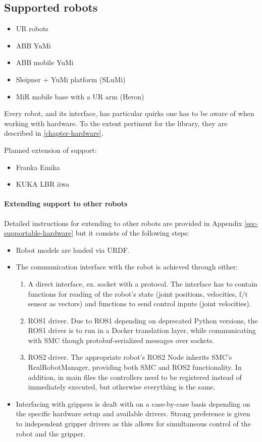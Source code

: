 \subsection{Supported robots}
\begin{itemize}
  \item UR robots
  \item ABB YuMi
  \item ABB mobile YuMi
  \item Sleipner + YuMi platform (SLuMi) 
  \item MiR mobile base with a UR arm (Heron)
\end{itemize}
Every robot, and its interface, has particular quirks
one has to be aware of when working with hardware.
To the extent pertinent for the library,
they are described in \ref{chapter-hardware}.

Planned extension of support:
\begin{itemize}
\item Franka Emika
\item KUKA LBR iiwa
\end{itemize}


\paragraph{Extending support to other robots}
Detailed instructions for extending to other robots are 
provided in Appendix \ref{sec-supportable-hardware}
but it consists of the following steps:
\begin{itemize}
\item Robot models are loaded via URDF.
\item The communication interface with the robot is achieved through either:
\begin{enumerate}
\item A direct interface, ex. socket with a protocol.
The interface has to contain functions for reading of the robot's state (joint positions, velocities, f/t sensor as vectors)
  and functions to send control inputs (joint velocities).
\item ROS1 driver. Due to ROS1 depending on deprecated 
	Python versions, the ROS1 driver is to run in a Docker
	translation layer, while communicating
	with SMC though protobuf-serialized messages over sockets.
\item ROS2 driver. The appropriate robot's ROS2 Node inherits
	SMC's RealRobotManager, providing both SMC and ROS2 functionality.
	In addition, in main files the controllers need to be registered
	instead of immediately executed,
	but otherwise everything is the same.
\end{enumerate}
\item Interfacing with grippers is dealt with on a case-by-case basis
	depending on the specific hardware setup and available drivers.
	Strong preference is given to independent gripper drivers
	as this allows for simultaneous control of the robot and
	the gripper.
\end{itemize}

